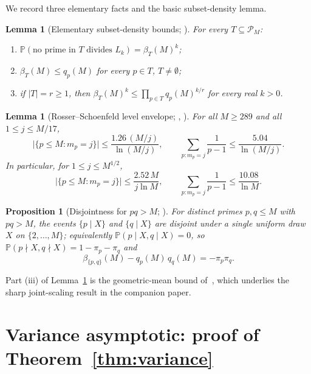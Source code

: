 \documentclass[11pt]{article}
\newtheorem{proposition}[theorem]{Proposition}
\newtheorem{lemma}[theorem]{Lemma}
\theoremstyle{remark}
\newcommand{\PP}{\mathbb{P}}
\newcommand{\PM}{\mathcal{P}_M}
\begin{document}
We record three elementary facts and the basic subset-density lemma.

\begin{lemma}[Elementary subset-density bounds; {\cite[Lems.~2.1--2.4]{wakid1}}]\label{lem:beta-basic}
For every $T \subseteq \PM$:
\begin{enumerate}[label=(\roman*), leftmargin=2em]
\item $\PP(\text{no prime in $T$ divides $L_k$}) = \beta_T(M)^k$;
\item $\beta_T(M) \leq q_p(M)$ for every $p \in T$, $T \neq \emptyset$;
\item if $|T| = r \geq 1$, then $\beta_T(M)^k \leq \prod_{p \in T} q_p(M)^{k/r}$ for every real $k > 0$.
\end{enumerate}
\end{lemma}

\begin{lemma}[Rosser--Schoenfeld level envelope; {\cite{RosserSchoenfeld1962}, \cite[Lem.~6.3]{wakid1}}]\label{lem:envelope}
For all $M \geq 289$ and all $1 \leq j \leq M/17$,
\[
\bigl|\{p \leq M : m_p = j\}\bigr| \leq \frac{1.26\,(M/j)}{\ln(M/j)}, \qquad \sum_{p \colon m_p = j} \frac{1}{p-1} \leq \frac{5.04}{\ln(M/j)}.
\]
In particular, for $1 \leq j \leq M^{1/2}$,
\[
\bigl|\{p \leq M : m_p = j\}\bigr| \leq \frac{2.52\,M}{j\ln M},
\qquad
\sum_{p \colon m_p = j} \frac{1}{p-1} \leq \frac{10.08}{\ln M}.
\]
\end{lemma}

\begin{proposition}[Disjointness for $pq > M$; {\cite[Rem.~5.6]{wakid1}}]\label{prop:disjoint}
For distinct primes $p, q \leq M$ with $pq > M$, the events $\{p \mid X\}$ and $\{q \mid X\}$ are disjoint under a single uniform draw $X$ on $\{2, \ldots, M\}$; equivalently $\PP(p \mid X, q \mid X) = 0$, so $\PP(p \nmid X, q \nmid X) = 1 - \pi_p - \pi_q$ and
\[
\beta_{\{p,q\}}(M) - q_p(M)\, q_q(M) = -\pi_p \pi_q.
\]
\end{proposition}

Part (iii) of Lemma~\ref{lem:beta-basic} is the geometric-mean bound of~\cite[Lem.~2.4]{wakid1}, which underlies the sharp joint-scaling result in the companion paper.

\section{Variance asymptotic: proof of Theorem~\ref{thm:variance}}\label{sec:variance-proof}
\end{document}

